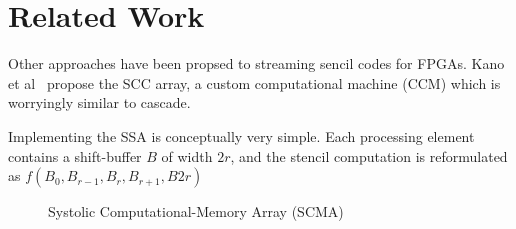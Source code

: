 \section{Related Work}

Other approaches have been propsed to streaming sencil codes for FPGAs.
Kano et al~\cite{sano:2014aa} propose the SCC array, a custom computational machine (CCM) which is worryingly similar to cascade.



Implementing the SSA is conceptually very simple.
Each processing element contains a shift-buffer $B$ of width $2r$, and the stencil computation is reformulated as $f(B_0, B_{r-1}, B_{r}, B_{r+1}, B{2r})$



\begin{figure}
  \centering
  
  \caption{Systolic Computational-Memory Array (SCMA)}
  \label{fig:scma}
\end{figure}